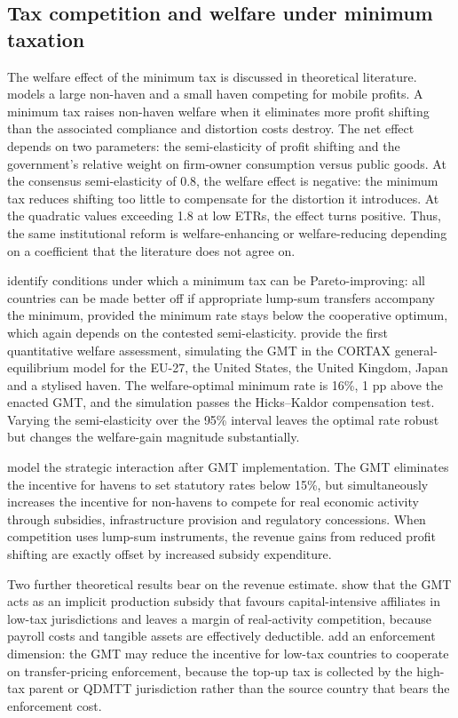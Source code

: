 \documentclass[11pt,a4paper]{article}
\begin{document}
\subsection{Tax competition and welfare under minimum taxation}\label{sec:theory_lit}

The welfare effect of the minimum tax is discussed in theoretical literature. \citet{johannesen2022} models a large non-haven and a small haven competing for mobile profits. A minimum tax raises non-haven welfare when it eliminates more profit shifting than the associated compliance and distortion costs destroy. The net effect depends on two parameters: the semi-elasticity of profit shifting and the government's relative weight on firm-owner consumption versus public goods. At the \citet{heckemeyer2017} consensus semi-elasticity of 0.8, the welfare effect is negative: the minimum tax reduces shifting too little to compensate for the distortion it introduces. At the \citet{dowd2017} quadratic values exceeding 1.8 at low ETRs, the effect turns positive. Thus, the same institutional reform is welfare-enhancing or welfare-reducing depending on a coefficient that the literature does not agree on.

\citet{hebous2023} identify conditions under which a minimum tax can be Pareto-improving: all countries can be made better off if appropriate lump-sum transfers accompany the minimum, provided the minimum rate stays below the cooperative optimum, which again depends on the contested semi-elasticity. \citet{vantriet2025} provide the first quantitative welfare assessment, simulating the GMT in the CORTAX general-equilibrium model for the EU-27, the United States, the United Kingdom, Japan and a stylised haven. The welfare-optimal minimum rate is 16\%, 1 pp above the enacted GMT, and the simulation passes the Hicks--Kaldor compensation test. Varying the semi-elasticity over the \citet{heckemeyer2017} 95\% interval leaves the optimal rate robust but changes the welfare-gain magnitude substantially.

\citet{janeba2023} model the strategic interaction after GMT implementation. The GMT eliminates the incentive for havens to set statutory rates below 15\%, but simultaneously increases the incentive for non-havens to compete for real economic activity through subsidies, infrastructure provision and regulatory concessions. When competition uses lump-sum instruments, the revenue gains from reduced profit shifting are exactly offset by increased subsidy expenditure. 

Two further theoretical results bear on the revenue estimate. \citet{schjelderup2024} show that the GMT acts as an implicit production subsidy that favours capital-intensive affiliates in low-tax jurisdictions and leaves a margin of real-activity competition, because payroll costs and tangible assets are effectively deductible. \citet{jean2026} add an enforcement dimension: the GMT may reduce the incentive for low-tax countries to cooperate on transfer-pricing enforcement, because the top-up tax is collected by the high-tax parent or QDMTT jurisdiction rather than the source country that bears the enforcement cost.
\end{document}
